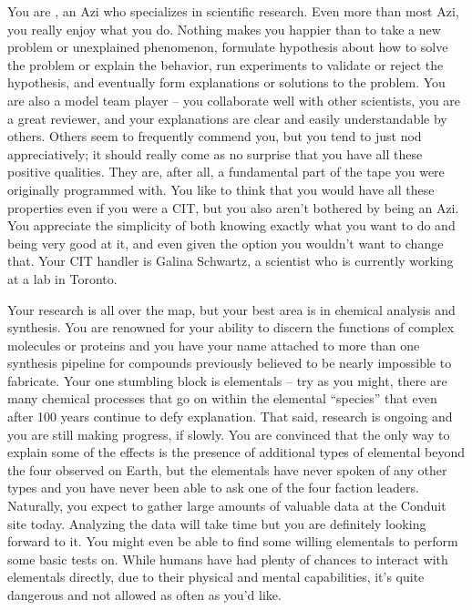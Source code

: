 \documentclass[char]{elementals}
\begin{document}
\name{\cScientist{}}

You are \cScientist{\intro}, an Azi who specializes in scientific research. Even more than most Azi, you really enjoy what you do. Nothing makes you happier than to take a new problem or unexplained phenomenon, formulate hypothesis about how to solve the problem or explain the behavior, run experiments to validate or reject the hypothesis, and eventually form explanations or solutions to the problem. You are also a model team player -- you collaborate well with other scientists, you are a great reviewer, and your explanations are clear and easily understandable by others. Others seem to frequently commend you, but you tend to just nod appreciatively; it should really come as no surprise that you have all these positive qualities. They are, after all, a fundamental part of the tape you were originally programmed with. You like to think that you would have all these properties even if you were a CIT, but you also aren't bothered by being an Azi. You appreciate the simplicity of both knowing exactly what you want to do and being very good at it, and even given the option you wouldn't want to change that. Your CIT handler is Galina Schwartz, a scientist who is currently working at a lab in Toronto.

Your research is all over the map, but your best area is in chemical analysis and synthesis. You are renowned for your ability to discern the functions of complex molecules or proteins and you have your name attached to more than one synthesis pipeline for compounds previously believed to be nearly impossible to fabricate. Your one stumbling block is elementals -- try as you might, there are many chemical processes that go on within the elemental ``species'' that even after 100 years continue to defy explanation. That said, research is ongoing and you are still making progress, if slowly. You are convinced that the only way to explain some of the effects is the presence of additional types of elemental beyond the four observed on Earth, but the elementals have never spoken of any other types and you have never been able to ask one of the four faction leaders. Naturally, you expect to gather large amounts of valuable data at the Conduit site today. Analyzing the data will take time but you are definitely looking forward to it. You might even be able to find some willing elementals to perform some basic tests on. While humans have had plenty of chances to interact with elementals directly, due to their physical and mental capabilities, it's quite dangerous and not allowed as often as you'd like.
\end{document}
